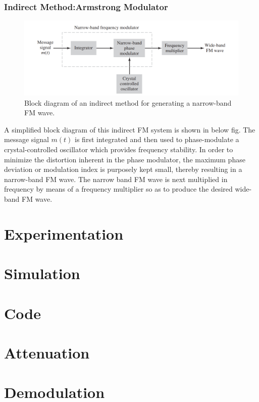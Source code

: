\documentclass[12pt,a4paper]{article}%
\begin{document}
\begin{flushleft}
	\subsubsection{Indirect Method:Armstrong Modulator}
	\begin{center}
		\begin{figure}[!ht]
			\centering
			\includegraphics[scale=0.4]{./images/BD2.png}
			\caption{Block diagram of an indirect method for generating a narrow-band FM wave.}
			\label{BD2}
		\end{figure}
	\end{center}
	
	
	A simplified block diagram of this indirect FM system is shown in below fig. The message signal $m(t)$ is first integrated and then used to phase-modulate a crystal-controlled oscillator which provides frequency stability. In order to minimize the distortion inherent in the phase modulator, the maximum phase deviation or modulation index is purposely kept small, thereby resulting in a narrow-band FM wave. The narrow band FM wave is next multiplied in frequency by means of a frequency multiplier so as to produce the desired wide-band FM wave.
	\end{flushleft}
	\pagebreak
	\section{Experimentation}
	\pagebreak
	\section{Simulation}
	\pagebreak
	\section{Code}
	\pagebreak
	\section{Attenuation}
	\pagebreak
	\section{Demodulation}
	\pagebreak
 	
\end{document}
